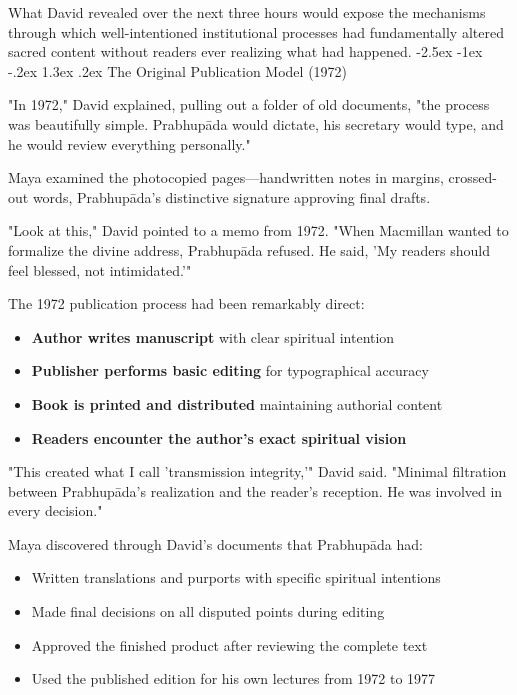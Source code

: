 \documentclass[12pt,twoside]{book}
\makeatletter
\renewcommand\section{\@startsection{section}{1}{\z@}%
{-2.5ex \@plus -1ex \@minus -.2ex}%
{1.3ex \@plus.2ex}%
{\normalfont\Large\bfseries}}
\makeatother
\begin{document}
What David revealed over the next three hours would expose the mechanisms through which well-intentioned institutional processes had fundamentally altered sacred content without readers ever realizing what had happened.
\section{The Original Publication Model (1972)}
\label{sec:orgb1ff4ad}

"In 1972," David explained, pulling out a folder of old documents, "the process was beautifully simple. Prabhupāda would dictate, his secretary would type, and he would review everything personally."

Maya examined the photocopied pages—handwritten notes in margins, crossed-out words, Prabhupāda's distinctive signature approving final drafts.

"Look at this," David pointed to a memo from 1972. "When Macmillan wanted to formalize the divine address, Prabhupāda refused. He said, 'My readers should feel blessed, not intimidated.'"

The 1972 publication process had been remarkably direct:
\begin{itemize}
\item \textbf{\textbf{Author writes manuscript}} with clear spiritual intention
\item \textbf{\textbf{Publisher performs basic editing}} for typographical accuracy
\item \textbf{\textbf{Book is printed and distributed}} maintaining authorial content
\item \textbf{\textbf{Readers encounter the author's exact spiritual vision}}
\end{itemize}

"This created what I call 'transmission integrity,'" David said. "Minimal filtration between Prabhupāda's realization and the reader's reception. He was involved in every decision."

Maya discovered through David's documents that Prabhupāda had:
\begin{itemize}
\item Written translations and purports with specific spiritual intentions
\item Made final decisions on all disputed points during editing
\item Approved the finished product after reviewing the complete text
\item Used the published edition for his own lectures from 1972 to 1977
\end{itemize}
\end{document}
